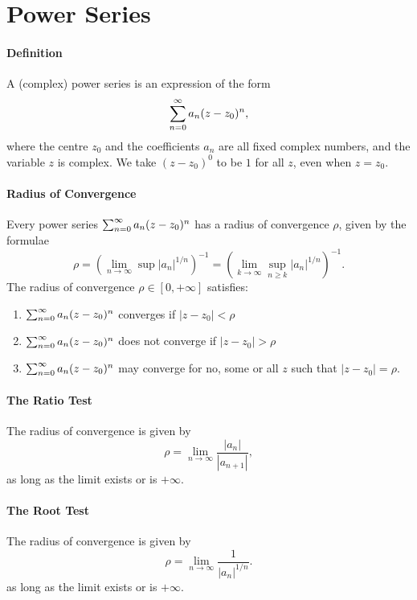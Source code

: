 \section{Power Series}

\paragraph{Definition}
A (complex) power series is an expression of the form
\[\sum_{n=0}^{\infty} a_n(z - z_0)^n,\]
where the centre \(z_0\) and the coefficients \(a_n\) are all fixed complex numbers, and the variable \(z\) is complex. We take \((z - z_0)^0\) to be \(1\) for all \(z\), even when \(z = z_0\).

\paragraph{Radius of Convergence}
Every power series \(\sum_{n=0}^{\infty} a_n(z - z_0)^n\) has a radius of convergence \(\rho\), given by the formulae
\[\rho = \left(\lim_{n\to\infty}\sup|a_n|^{1/n} \right)^{-1} = \left(\lim_{k\to\infty}\sup_{n\geq k}|a_n|^{1/n} \right)^{-1}.\]
The radius of convergence \(\rho \in [0, +\infty]\) satisfies:
\begin{enumerate}[label=(\alph*)]
    \item \(\sum_{n=0}^{\infty} a_n(z - z_0)^n\) converges if \(|z - z_0| < \rho\)
    \item \(\sum_{n=0}^{\infty} a_n(z - z_0)^n\) does not converge if \(|z - z_0| > \rho\)
    \item \(\sum_{n=0}^{\infty} a_n(z - z_0)^n\) may converge for no, some or all \(z\) such that \(|z - z_0| = \rho\).
\end{enumerate}

\paragraph{The Ratio Test}
The radius of convergence is given by
\[\rho = \lim_{n\to\infty} \frac{|a_n|}{|a_{n+1}|},\]
as long as the limit exists or is \(+\infty\).

\paragraph{The Root Test}
The radius of convergence is given by
\[\rho = \lim_{n\to\infty} \frac{1}{|a_n|^{1/n}}.\]
as long as the limit exists or is \(+\infty\).

